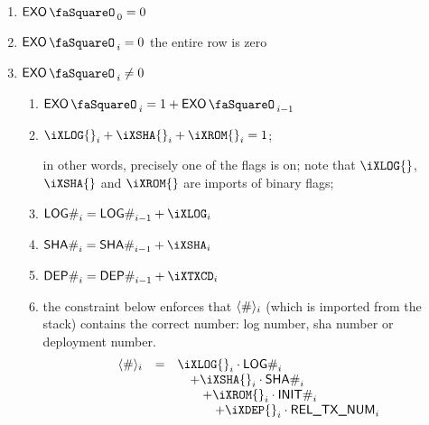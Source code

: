 \begin{enumerate}
	\item $\exoStamp_0 = 0$
	\item \If $\exoStamp_{i} = 0$ \Then the entire row is zero
	\item \If $\exoStamp_{i} \neq 0$ \Then
	\begin{enumerate}
		\item $\exoStamp_{i} = 1 + \exoStamp_{i - 1}$
		\item $\iXLOG{}_{i} + \iXSHA{}_{i} + \iXROM{}_{i} = 1$;

		in other words, precisely one of the flags is on; note that $\iXLOG{}$, $\iXSHA{}$ and $\iXROM{}$ are imports of binary flags;
		\item $\logNum_{i} = \logNum_{i - 1} + \iXLOG_{i}$
		\item $\shaNum_{i} = \shaNum_{i - 1} + \iXSHA_{i}$
		\item $\depNum_{i} = \depNum_{i - 1} + \iXTXCD_{i}$
		\item the constraint below enforces that $\langle{}\#\rangle{}_{i}$ (which is imported from the stack) contains the correct number: log number, sha number or deployment number.
		\[
			\begin{array}{rcl}
				\iNum_{i}
				& = &
				\iXLOG{}_{i} \cdot \logNum_{i} \\
				&&\quad + \iXSHA{}_{i} \cdot \shaNum_{i} \\
				&&\quad\quad + \iXROM{}_{i} \cdot \initNum_{i} \\
				&&\quad\quad\quad + \iXDEP{}_{i} \cdot \txNum_{i} \\
			\end{array}
		\]
	\end{enumerate}
\end{enumerate}